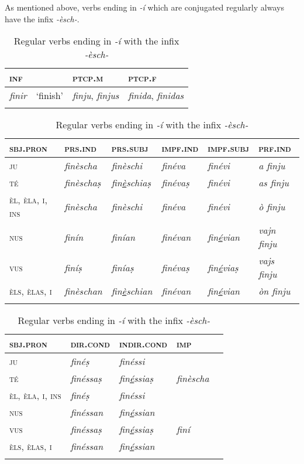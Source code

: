 As mentioned above, verbs ending in \textit{-í} which are conjugated regularly always have the infix \textit{-èsch-}.

\begin{table}
	\caption{Regular verbs ending in \textit{-í} with the infix \textit{-èsch-}}
	\label{tab:reg.verb-i}
	\begin{tabularx}{.7\textwidth}{llll}
		
		\lsptoprule
		\textsc{inf} & & \textsc{ptcp.m}  & \textsc{ptcp.f}  \\
		\midrule
		\textit{finir} & `finish' & \textit{finju}, \textit{finjus} & \textit{finida}, \textit{finidas} \\
		\lspbottomrule  
	\end{tabularx}
	
	\medskip
	
	\begin{tabularx}{\textwidth}{p{}lllll}
		\lsptoprule
		\textsc{sbj.pron} &\textsc{prs.ind} &\textsc{prs.subj} &\textsc{impf.ind} & \textsc{impf.subj} &\textsc{prf.ind}\\
		\midrule
		\textsc{ju} & \textit{finèscha} & \textit{finèschi} & \textit{finéva} & \textit{finévi} & \textit{a finju} \\
		\textsc{té} & \textit{finèschaṣ} & \textit{fin\underline{è}schiaṣ} & \textit{finévaṣ} & \textit{finévi} & \textit{as finju}\\
		\textsc{èl, èla, i, ins} & \textit{finèscha}  & \textit{finèschi} & \textit{finéva} & \textit{finévi} & \textit{ò finju}\\
		\textsc{nus} & \textit{finín} & \textit{finían} & \textit{finévan} & \textit{fin\underline{é}vian} &\textit{vajn finju}\\
		\textsc{vus} & \textit{finíṣ} & \textit{finíaṣ} & \textit{finévaṣ} & \textit{fin\underline{é}viaṣ} & \textit{vajs finju} \\
		\textsc{èls, èlas, i} & \textit{finèschan}  & \textit{fin\underline{è}schian} & \textit{finévan} & \textit{fin\underline{é}vian} & \textit{òn finju}\\
		\lspbottomrule
	\end{tabularx}
	
	\medskip
	
	\begin{tabularx} {\textwidth}{p{2cm}XXXX}
		\lsptoprule
		\textsc{sbj.pron} &\textsc{dir.cond} &  \textsc{indir.cond} &\textsc{imp}\\
		\midrule
		\textsc{ju} & \textit{finéṣ} & \textit{finéssi} \\
		\textsc{té} & \textit{finéssaṣ} &\textit{fin\underline{é}ssiaṣ}  &  \textit{finèscha}\\
		\textsc{èl, èla, i, ins} & \textit{finéṣ}  & \textit{finéssi}\\
		\textsc{nus} & \textit{finéssan} &  \textit{fin\underline{é}ssian}\\
		\textsc{vus} &  \textit{finéssaṣ} & \textit{fin\underline{é}ssiaṣ} & \textit{finí}\\
		\textsc{èls, èlas, i} & \textit{finéssan} & \textit{fin\underline{é}ssian}\\
		\lspbottomrule
	\end{tabularx} 
\end{table}
